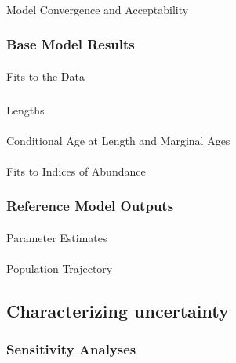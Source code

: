\documentclass[
]{scrartcl}
\makeatletter
\let\oldparagraph\paragraph
\renewcommand{\paragraph}{
    \@ifstar
      \xxxParagraphStar
      \xxxParagraphNoStar
  }
\newcommand{\xxxParagraphStar}[1]{\oldparagraph*{#1}\mbox{}}
\newcommand{\xxxParagraphNoStar}[1]{\oldparagraph{#1}\mbox{}}
\let\oldsubparagraph\subparagraph
\renewcommand{\subparagraph}{
    \@ifstar
      \xxxSubParagraphStar
      \xxxSubParagraphNoStar
  }
\newcommand{\xxxSubParagraphStar}[1]{\oldsubparagraph*{#1}\mbox{}}
\newcommand{\xxxSubParagraphNoStar}[1]{\oldsubparagraph{#1}\mbox{}}
\makeatother
\begin{document}
\paragraph{Model Convergence and Acceptability}\label{model-convergence}

\subsubsection{Base Model Results}\label{base-model-results}

\paragraph{Fits to the Data}\label{fits-to-the-data}

\subparagraph{Lengths}\label{lengths}

\paragraph{Conditional Age at Length and Marginal
Ages}\label{conditional-age-at-length-and-marginal-ages}

\paragraph{Fits to Indices of
Abundance}\label{fits-to-indices-of-abundance}

\subsubsection{Reference Model Outputs}\label{reference-model-outputs}

\paragraph{Parameter Estimates}\label{parameter-estimates}

\paragraph{Population Trajectory}\label{population-trajectory}

\newpage{}

\subsection{Characterizing
uncertainty}\label{characterizing-uncertainty}

\subsubsection{Sensitivity Analyses}\label{sec-assmt-sens}
\end{document}
